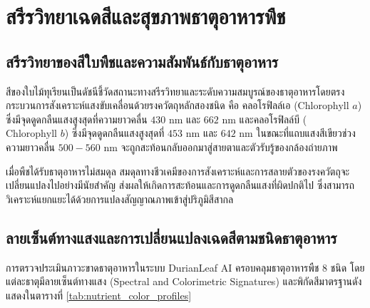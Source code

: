 \chapter{สรีรวิทยาเฉดสีและสุขภาพธาตุอาหารพืช}

\section{สรีรวิทยาของสีใบพืชและความสัมพันธ์กับธาตุอาหาร}
สีของใบไม้ทุเรียนเป็นดัชนีชี้วัดสถานะทางสรีรวิทยาและระดับความสมบูรณ์ของธาตุอาหารโดยตรง กระบวนการสังเคราะห์แสงขับเคลื่อนด้วยรงควัตถุหลักสองชนิด คือ คลอโรฟิลล์เอ ($\text{Chlorophyll } a$) ซึ่งมีจุดดูดกลืนแสงสูงสุดที่ความยาวคลื่น $430\text{ nm}$ และ $662\text{ nm}$ และคลอโรฟิลล์บี ($\text{Chlorophyll } b$) ซึ่งมีจุดดูดกลืนแสงสูงสุดที่ $453\text{ nm}$ และ $642\text{ nm}$ ในขณะที่แถบแสงสีเขียวช่วงความยาวคลื่น $500 - 560\text{ nm}$ จะถูกสะท้อนกลับออกมาสู่สายตาและตัวรับรู้ของกล้องถ่ายภาพ

เมื่อพืชได้รับธาตุอาหารไม่สมดุล สมดุลทางชีวเคมีของการสังเคราะห์และการสลายตัวของรงควัตถุจะเปลี่ยนแปลงไปอย่างมีนัยสำคัญ ส่งผลให้เกิดการสะท้อนและการดูดกลืนแสงที่ผิดปกติไป ซึ่งสามารถวิเคราะห์แยกแยะได้ด้วยการแปลงสัญญาณภาพเข้าสู่ปริภูมิสีสากล

\section{ลายเซ็นต์ทางแสงและการเปลี่ยนแปลงเฉดสีตามชนิดธาตุอาหาร}
การตรวจประเมินภาวะขาดธาตุอาหารในระบบ DurianLeaf AI ครอบคลุมธาตุอาหารพืช 8 ชนิด โดยแต่ละธาตุมีลายเซ็นต์ทางแสง (Spectral and Colorimetric Signatures) และพิกัดสีมาตรฐานดังแสดงในตารางที่ \ref{tab:nutrient_color_profiles}

